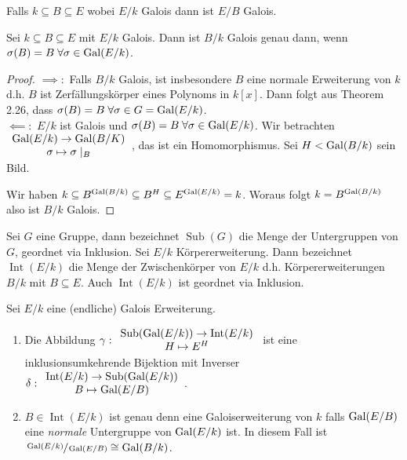 \begin{corollary}
	Falls $k \subseteq B \subseteq E$ wobei $E / k $ Galois dann ist $E / B$ Galois.
\end{corollary}

\begin{proposition}
	Sei $k \subseteq B \subseteq E$ mit $E / k$ Galois. Dann ist $B / k$ Galois genau dann, wenn $\sigma(B) = B \forall \sigma \in \gal(E / k)$.
\end{proposition}

\begin{proof}
	$\implies:$ Falls $B / k$ Galois, ist insbesondere $B$ eine normale Erweiterung von $k$ d.h. $B$ ist Zerfällungskörper eines Polynoms in $k[x]$.
	Dann folgt aus Theorem 2.26, dass $\sigma(B) = B \forall \sigma \in G = \gal(E / k)$.\\
	$\impliedby:$ $E / k$ ist Galois und $\sigma(B) = B \forall \sigma \in \gal(E / k)$. Wir betrachten $\begin{array}{c} \operatorname{Gal}(E / k) \to \operatorname{Gal}(B / K)\\ \sigma \mapsto \sigma \mid_{B}\\ \end{array}$,
	das ist ein Homomorphismus. Sei $H < \operatorname{Gal}(B / k)$ sein Bild.

	Wir haben $k \subseteq B^{\operatorname{Gal}(B / k)} \subseteq B^{H} \subseteq E^{\operatorname{Gal}(E / k)} = k$. Woraus folgt $k = B^{\operatorname{Gal}(B / k)}$ also ist $B / k$ Galois.
\end{proof}

\begin{definition}
	Sei $G$ eine Gruppe, dann bezeichnet $\operatorname{Sub}(G)$ die Menge der Untergruppen von $G$, geordnet via Inklusion.
	Sei $E / k$ Körpererweiterung. Dann bezeichnet $\operatorname{Int}(E / k)$ die Menge der Zwischenkörper von $E / k$ d.h. Körpererweiterungen $B / k$ mit $B \subseteq E$.
	Auch $\operatorname{Int}(E / k)$ ist geordnet via Inklusion.
\end{definition}

\begin{theorem}
	Sei $E / k$ eine (endliche) Galois Erweiterung.
	\begin{enumerate}[(1)]
	\item Die Abbildung $\gamma: \begin{array}{c} \operatorname{Sub}(\operatorname{Gal}(E / k)) \to \operatorname{Int}(E / k)\\ H \mapsto E^{H}\\ \end{array}$ ist eine inklusionsumkehrende Bijektion
		mit Inverser $\delta: \begin{array}{c} \operatorname{Int}(E / k) \to \operatorname{Sub}(\operatorname{Gal}(E / k))\\ B \mapsto \operatorname{Gal}(E / B)\\ \end{array}$.
	\item $B \in \operatorname{Int}(E / k)$ ist genau denn eine Galoiserweiterung von $k$ falls $\operatorname{Gal}(E / B)$ eine \emph{normale} Untergruppe von $\operatorname{Gal}(E / k)$ ist.
		In diesem Fall ist $\sfrac{\operatorname{Gal}(E / k)}{\operatorname{Gal}(E / B)} \cong \operatorname{Gal}(B / k)$.
	\end{enumerate}
\end{theorem}

